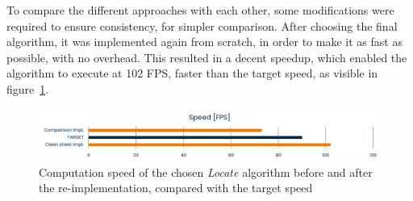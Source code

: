 To compare the different approaches with each other, some modifications were required to ensure consistency, for simpler comparison.
After choosing the final algorithm, it was implemented again from scratch, in order to make it as fast as possible, with no overhead.
This resulted in a decent speedup, which enabled the algorithm to execute at 102 FPS, faster than the target speed, as visible in figure~\ref{fig:locate:speed-cleansheet}.

\begin{figure}
	\centerline{\includegraphics[width=\textwidth]{images/locate-cleansheet-speed.png}}
	\caption{\centering Computation speed of the chosen \textit{Locate} algorithm before and after the re-implementation, compared with the target speed}
	\label{fig:locate:speed-cleansheet}
\end{figure}
